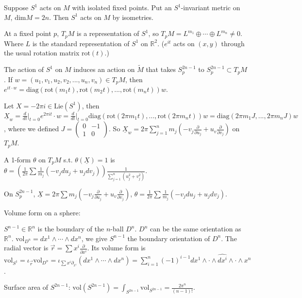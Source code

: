 \documentclass{article}
\theoremstyle{mystyle}
\theoremstyle{remark}
\numberwithin{equation}{section}
\begin{document}
Suppose $S^1$ acts on $M$ with isolated fixed points. Put an $S^1$-invariant metric on $M$, $\text{dim}M = 2n$. Then $S^1$ acts on $M$ by isometries.

At a fixed point $p$, $T_pM$ is a representation of $S^1$, so $T_pM = L^{m_1}\oplus \cdots \oplus L^{m_n} \neq 0 $. Where $L$ is the standard representation of $S^1$ on $\mathbb{R}^2$. ($e^{it}$ acts on $(x,y)$ through the usual rotation matrix $\text{rot}(t)$.)

The action of $S^1$ on $M$ induces an action on $\widetilde{M}$ that takes $S^{2n-1}_p$ to $S^{2n-1}_p \subset T_pM$. If $w = (u_1,v_1,u_2,v_2,...,u_n,v_n)\in T_pM$,  then $e^{it\cdot w} = 
\mathrm{diag}(\text{rot}(m_1t),\text{rot}(m_2t),...,\text{rot}(m_nt))w$.

Let $X = -2 \pi i \in \mathrm{Lie}(S^1)$, then $\underline{X}_w = \frac{d}{dt}\Big|_{t=0} e^{2\pi i t} \cdot w = \frac{d}{dt}\Big|_{t=0} \mathrm{diag}(\text{rot}(2\pi m_1t),...,\text{rot}(2\pi m_nt))w
=
\text{diag} ( 2\pi m_1 J,...,2\pi m_n J)w$, where we defined $J = \begin{pmatrix} 0&-1\\1&0\end{pmatrix}$.  So $\underline{X}_w = 2\pi \sum_{j=1}^n  m_j\left(- v_j \frac{\partial}{\partial u_j} + u_v \frac{\partial}{\partial v_j}\right)$ on $T_pM$.  

A 1-form $\theta$ on $T_pM$ s.t. $\theta(\underline{X})=1$ is $\theta = \left(\frac{1}{2\pi} \sum \frac{1}{m_j}(-v_j du_j+u_jd v_j)\right) \frac{1}{\sum_{j=1}^n (u_j^2+v_j^2)}$. 


On $S^{2n-1}_p$, $\underline{X} = 2\pi \sum m_j \left(- v_j \frac{\partial}{\partial u_j} + u_v \frac{\partial}{\partial v_j}\right)$, $\theta = \frac{1}{2\pi}\sum \frac{1}{m_j} (-v_j du_j + u_j dv_j)$.


Volume form on a sphere:

$S^{n-1}\in \mathbb{R}^n$ is the boundary of the $n$-ball $D^n$. $D^n$ can be the same orientation as $\mathbb{R}^n$. $\mathrm{vol}_{D^n} = dx^1 \wedge \cdots \wedge dx^n$, we give $S^{n-1}$ the boundary orientation of $D^n$. The radial vector is $\vec{r} = \sum x^i \frac{\partial}{\partial x^i}$. Its volume form is $\mathrm{vol}_{S^1} = \iota_{\vec{r}}\mathrm{vol}_{D^n} = \iota_{\sum x^i \partial_{x^i}} (dx^1\wedge \cdots \wedge dx^n) = \sum_{i=1}^n (-1)^{i-1} dx^1 \wedge \cdot \wedge \hat{d x^i} \wedge \cdot \wedge x^n$.

Surface area of $S^{2n-1}$: $\mathrm{vol}(S^{2n-1}) = \int_{S^{2n-1}} \mathrm{vol}_{S^{2n-1}} = \frac{2\pi^n}{(n-1)!}$. 
\end{document}
